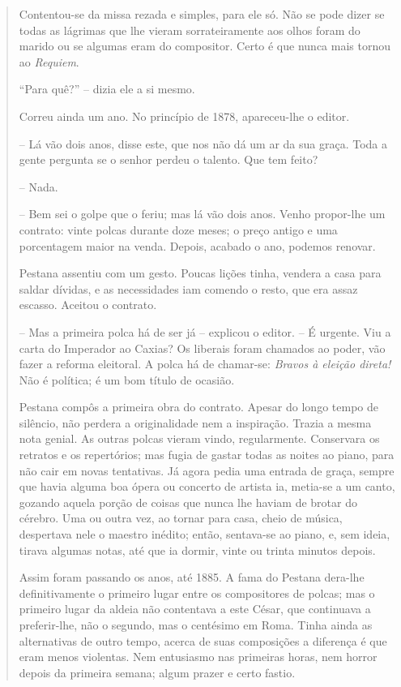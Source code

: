 \begin{quote}
Contentou-se da missa rezada e simples, para ele só. Não se pode dizer
se todas as lágrimas que lhe vieram sorrateiramente aos olhos foram do
marido ou se algumas eram do compositor. Certo é que nunca mais tornou
ao \emph{Requiem}.

``Para quê?'' -- dizia ele a si mesmo.

Correu ainda um ano. No princípio de 1878, apareceu-lhe o editor.

-- Lá vão dois anos, disse este, que nos não dá um ar da sua graça. Toda
a gente pergunta se o senhor perdeu o talento. Que tem feito?

-- Nada.

-- Bem sei o golpe que o feriu; mas lá vão dois anos. Venho propor-lhe
um contrato: vinte polcas durante doze meses; o preço antigo e uma
porcentagem maior na venda. Depois, acabado o ano, podemos renovar.

Pestana assentiu com um gesto. Poucas lições tinha, vendera a casa para
saldar dívidas, e as necessidades iam comendo o resto, que era assaz
escasso. Aceitou o contrato.

-- Mas a primeira polca há de ser já -- explicou o editor. -- É urgente.
Viu a carta do Imperador ao Caxias? Os liberais foram chamados ao poder,
vão fazer a reforma eleitoral. A polca há de chamar-se: \emph{Bravos à
eleição direta!} Não é política; é um bom título de ocasião.

Pestana compôs a primeira obra do contrato. Apesar do longo tempo de
silêncio, não perdera a originalidade nem a inspiração. Trazia a mesma
nota genial. As outras polcas vieram vindo, regularmente. Conservara os
retratos e os repertórios; mas fugia de gastar todas as noites ao piano,
para não cair em novas tentativas. Já agora pedia uma entrada de graça,
sempre que havia alguma boa ópera ou concerto de artista ia, metia-se a
um canto, gozando aquela porção de coisas que nunca lhe haviam de brotar
do cérebro. Uma ou outra vez, ao tornar para casa, cheio de música,
despertava nele o maestro inédito; então, sentava-se ao piano, e, sem
ideia, tirava algumas notas, até que ia dormir, vinte ou trinta minutos
depois.

Assim foram passando os anos, até 1885. A fama do Pestana dera-lhe
definitivamente o primeiro lugar entre os compositores de polcas; mas o
primeiro lugar da aldeia não contentava a este César, que continuava a
preferir-lhe, não o segundo, mas o centésimo em Roma. Tinha ainda as
alternativas de outro tempo, acerca de suas composições a diferença é
que eram menos violentas. Nem entusiasmo nas primeiras horas, nem horror
depois da primeira semana; algum prazer e certo fastio.


\end{quote}
